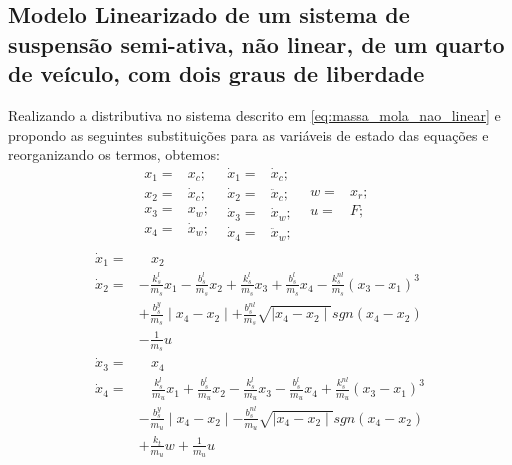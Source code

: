 \documentclass[a4paper]{ifacconf}
\begin{document}
        \subsection{Modelo Linearizado de um sistema de suspensão semi-ativa, não linear, de um quarto de veículo, com dois graus de liberdade }
    Realizando a distributiva no sistema descrito em \ref{eq:massa_mola_nao_linear} e propondo as seguintes substituições para as variáveis de estado das equações e reorganizando os termos, obtemos: 
    \begin{equation*}
        \begin{split}
            x_{1}=&x_{c};\ \ \\
            x_{2}=&\dot{x}_{c};\ \ \\
            x_{3}=&x_{w};\ \ \\
            x_{4}=&\dot{x}_{w};\ \ \\
        \end{split}
        \begin{split}
            \dot{x}_{1}=&\dot{x}_{c};\ \ \\
            \dot{x}_{2}=&\ddot{x}_{c};\ \ \\
            \dot{x}_{3}=&\dot{x}_{w};\ \ \\
            \dot{x}_{4}=&\ddot{x}_{w};\ \ \\
        \end{split}
        \begin{split}
            w=&x_{r};\ \ \\
            u=&F;\ \ \\
        \end{split} 
    \end{equation*}
    \begin{equation} \label{eq:massa_mola_nao_linear_SS}
        \begin{aligned}
        \dot{x}_{1}=&\ \ \ \ x_{2}\\
        \dot{x}_{2}=&-\frac{k^l_s}{m_s}x_1-\frac{b^l_s}{m_s}x_2+\frac{k^l_s}{m_s}x_3+\frac{b^l_s}{m_s}x_4-\frac{k^{nl}_s}{m_s}(x_3-x_1)^3\\
                    &+\frac{b^y_s}{m_s}\mid x_4-x_2\mid+\frac{b^{nl}_s}{m_s}\sqrt{\mid x_4-x_2\mid}sgn(x_4-x_2)\\
                    &-\frac{1}{m_s}u\\
        \dot{x}_{3}=&\ \ \ \ x_{4}\\
        \dot{x}_{4}=&\ \ \ \ \frac{k^l_s}{m_u}x_1+\frac{b^l_s}{m_u}x_2-\frac{k^l_s}{m_u}x_3-\frac{b^l_s}{m_u}x_4+\frac{k^{nl}_s}{m_u}(x_3-x_1)^3\\
                    &-\frac{b^y_s}{m_u}\mid x_4-x_2\mid-\frac{b^{nl}_s}{m_u}\sqrt{\mid x_4-x_2\mid}sgn(x_4-x_2)\\
                    &+\frac{k_t}{m_u}w+\frac{1}{m_u}u\\
        \end{aligned}
    \end{equation}
    
\end{document}
